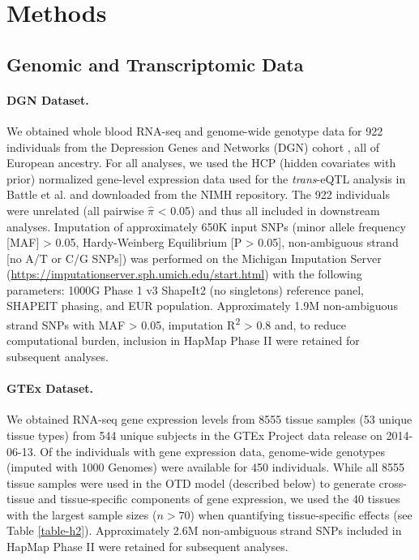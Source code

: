 \documentclass[10pt,letterpaper]{article}
\begin{document}
\section*{Methods}
\subsection*{Genomic and Transcriptomic
Data}\label{genomic-and-transcriptomic-data}

\paragraph*{DGN Dataset.}\label{dgn-dataset}

We obtained whole blood RNA-seq and genome-wide genotype data for 922
individuals from the Depression Genes and Networks (DGN) cohort
\cite{Battle_2013}, all of European ancestry. For all analyses, we used the HCP
(hidden covariates with prior) normalized gene-level expression data
used for the \emph{trans}-eQTL analysis in Battle et al. \cite{Battle_2013} and
downloaded from the NIMH repository. The 922 individuals were unrelated
(all pairwise \(\hat{\pi}\) \textless{} 0.05) and thus all included in
downstream analyses. Imputation of approximately 650K input SNPs (minor
allele frequency {[}MAF{]} \textgreater{} 0.05, Hardy-Weinberg
Equilibrium {[}P \textgreater{} 0.05{]}, non-ambiguous strand {[}no A/T
or C/G SNPs{]}) was performed on the Michigan
Imputation Server
(\url{https://imputationserver.sph.umich.edu/start.html}) \cite{Howie_2012,Fuchsberger_2014}
with the following parameters: 1000G Phase 1 v3 ShapeIt2 (no singletons)
reference panel, SHAPEIT phasing, and EUR population. Approximately 1.9M
non-ambiguous strand SNPs with MAF \textgreater{} 0.05, imputation
R\textsuperscript{2} \textgreater{} 0.8 and, to reduce computational
burden, inclusion in HapMap Phase II were retained for subsequent
analyses.

\paragraph*{GTEx Dataset.}\label{gtex-dataset}

We obtained RNA-seq gene expression levels from 8555 tissue samples (53
unique tissue types) from 544 unique subjects in the GTEx Project \cite{Ardlie_2015} 
data release on 2014-06-13. Of the individuals with gene
expression data, genome-wide genotypes (imputed with 1000 Genomes) were
available for 450 individuals. While all 8555 tissue samples were used
in the OTD model (described below) to generate cross-tissue and
tissue-specific components of gene expression, we used the 40 tissues
with the largest sample sizes ($n>70$) when quantifying tissue-specific effects (see Table \ref{table-h2}).
Approximately 2.6M non-ambiguous strand SNPs included in HapMap Phase II were retained for
subsequent analyses.
\end{document}
